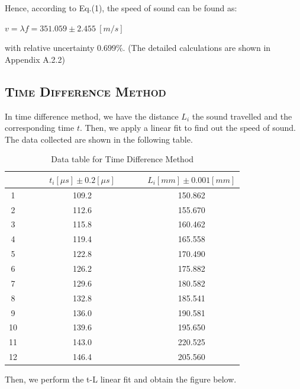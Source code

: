 \documentclass[a4paper,12pt]{article}
\begin{document}
Hence, according to Eq.(1), the speed of sound can be found as:

\begin{center}
$ v = \lambda f = 351.059 \pm 2.455~[m/s]$
\end{center}

with relative uncertainty $ 0.699\% $. (The detailed calculations are shown in Appendix A.2.2)


\subsection{\textsc{Time Difference Method}}

In time difference method, we have the distance $L_i$ the sound travelled and the corresponding time $ t $. Then, we apply a linear fit to find out the speed of sound. The data collected are shown in the following table.

\begin{table}[h]
\begin{center}
\begin{tabular}{|c|c|c|}
\hline
  & ~~~~~$t_i[\mu s] \pm 0.2[\mu s]$~~~~~ & $L_i[mm] \pm 0.001[mm]$ \\
\hline
1 & 109.2 & 150.862 \\
2 & 112.6 & 155.670 \\
3 & 115.8 & 160.462 \\
4 & 119.4 & 165.558 \\
5 & 122.8 & 170.490 \\
6 & 126.2 & 175.882 \\
7 & 129.6 & 180.582 \\
8 & 132.8 & 185.541 \\
9 & 136.0 & 190.581 \\
10 & 139.6 & 195.650 \\
11 & 143.0 & 220.525 \\
12 & 146.4 & 205.560 \\
\hline
\end{tabular}
\caption{Data table for Time Difference Method}
\end{center}
\end{table}

Then, we perform the t-L linear fit and obtain the figure below.
\end{document}
